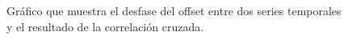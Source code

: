 \begin{figure}[H]
\begin{center}
\hspace{0.5cm}

\end{center}

\caption{Gráfico que muestra el desfase del offset entre dos series temporales y el resultado de la correlación cruzada.}
\end{figure}

